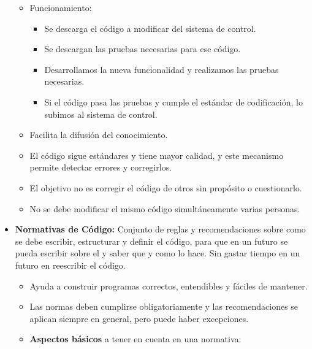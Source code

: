 \documentclass[12pt, twoside, openright]{report} %
\begin{document}
\begin{itemize}
\begin{itemize}
  \item Funcionamiento:
    

    \begin{itemize}
    \item Se descarga el código a modificar del sistema de control.
      
    \item Se descargan las pruebas necesarias para ese código.
      
    \item Desarrollamos la nueva funcionalidad y realizamos las pruebas
      necesarias.
      
    \item Si el código pasa las pruebas y cumple el estándar de
      codificación, lo subimos al sistema de control.
      
    \end{itemize}
  \item Facilita la difusión del conocimiento.
    
  \item El código sigue estándares y tiene mayor calidad, y este mecanismo
    permite detectar errores y corregirlos.
    
  \item El objetivo no es corregir el código de otros sin propósito o
    cuestionarlo.
    
  \item No se debe modificar el mismo código simultáneamente varias
    personas.
    
  \end{itemize}
\item \textbf{Normativas de Código:} Conjunto de reglas y recomendaciones
  sobre como se debe escribir, estructurar y definir el código, para que
  en un futuro se pueda escribir sobre el y saber que y como lo hace.
  Sin gastar tiempo en un futuro en reescribir el código.
  

  \begin{itemize}
  \item Ayuda a construir programas correctos, entendibles y fáciles de
    mantener.
    
  \item Las normas deben cumplirse obligatoriamente y las recomendaciones se
    aplican siempre en general, pero puede haber excepciones.
    
  \item \textbf{Aspectos básicos} a tener en cuenta en una normativa:
    


\end{itemize}
\end{itemize}
\end{document}
